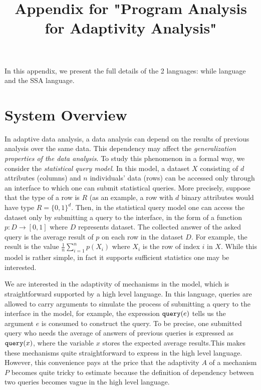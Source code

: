 \documentclass[a4paper,11pt]{article}
\begin{document}
\title{Appendix for "Program Analysis for Adaptivity Analysis"}

\author{}

\date{}

\maketitle

In this appendix, we present the full details of the 2 languages: while language and the SSA language.

\tableofcontents


\section{System Overview}


In adaptive data analysis, a data analysis can depend on the results of
previous analysis over the same data. This dependency may affect the
\emph{generalization properties of the data analysis}. To study this phenomenon
in a formal way, we consider the \emph{statistical query
  model}. In this model, a dataset $X$ consisting of $d$ attributes (columns) and $n$
individuals' data (rows) can be accessed only through an interface to
which one can submit statistical queries. More precisely, suppose that
the type of a row is $R$ (as an example, a row with $d$ binary
attributes would have type $R=\{0,1\}^d$. Then, in the statistical
query model one can access the dataset only by submitting a query to
the interface, in
the form of a function
$p:D\to [0,1] $ where $D$ represents dataset. The collected answer of
the asked query is the average result of $p$ on each row in the
dataset $D$. For example, the result is the
value $\frac{1}{n}\sum_{i=1}^n p(X_i)$ where
$X_i$ is the row of index $i$ in $X$. While this model is rather
simple, in fact it supports sufficient statistics one may be
interested.

 

We are interested in the adaptivity of mechanisms in the model, which is straightforward supported by a high level language. In this language, queries are allowed to carry arguments to simulate the process of submitting a query to the interface in
the model, for example, the expression ${\tt query}(e)$ tells us the argument $e$ is consumed to construct the
query. To be precise, one submitted query who needs the average of
answers of previous queries is expressed as ${\tt query}(x)$, where the variable $x$ stores
the expected average results.This makes these mechanisms quite straightforward to express in the high level language. However, this convenience pays at the price that the adaptivity $A$ of a mechanism $P$ becomes quite tricky to estimate because the definition of dependency between two queries becomes vague in the high level language. 
\end{document}
